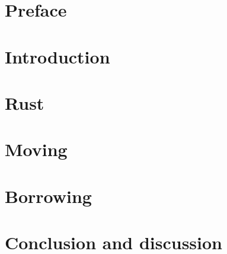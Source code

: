 \documentclass{report}
\begin{document}


\chapter*{Preface}


\tableofcontents

\chapter{Introduction}
\label{Introduction}


\chapter{Rust}
\label{Rust}


\chapter{Moving}
\label{Moving}


\chapter{Borrowing}
\label{Borrowing}


%

%

%

%

\chapter{Conclusion and discussion}
\label{Conclusion}


\newpage
{}


\end{document}
